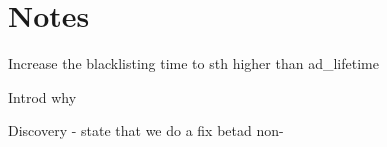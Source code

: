 
\section{Notes}
Increase the blacklisting time to sth higher than ad\_lifetime

Introd why


Discovery - state that we do a fix betad non-



